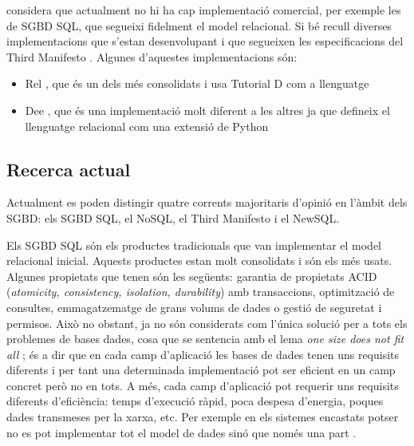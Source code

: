 \textcite[cap.~2]{date06} %
considera que actualment no hi ha cap implementació comercial, per
exemple les de \gls{SGBD} \gls{SQL}, que segueixi fidelment el model relacional.
Si bé recull diverses implementacions que
s'estan desenvolupant i que segueixen les
especificacions del Third
Manifesto \parencite[Projects]{date:thethirdmanifesto.com}.  Algunes
d'aquestes implementacions són:
\begin{itemize}
\item Rel \parencite{rel}, que és un dels més consolidats i usa
  Tutorial D com a llenguatge
\item Dee \parencite{dee}, que és una implementació molt diferent a
  les altres ja que defineix el llenguatge relacional com una extensió
  de Python

\end{itemize}










\subsection{Recerca actual}

Actualment es poden distingir quatre corrents majoritaris d'opinió en
l'àmbit dels \gls{SGBD}: els \gls{SGBD} \gls{SQL}, el NoSQL, el Third Manifesto i el
NewSQL.

Els \gls{SGBD} \gls{SQL} són els productes tradicionals que van implementar el
model relacional inicial. Aquests productes estan molt consolidats i
són els més usats. Algunes propietats que tenen són les següents:
garantia de propietats ACID (\emph{atomicity, consistency, isolation,
  durability}) amb transaccions, optimització de consultes,
emmagatzematge de grans volums de dades o gestió de seguretat i
permisos.  Això no obstant, ja no són considerats com l'única solució
per a tots els problemes de bases dades, cosa que se sentencia amb el
lema \emph{one size does not fit
  all} \parencite{stonebraker07,stonebraker09}; és a dir que en cada
camp d'aplicació les bases de dades tenen uns requisits diferents i
per tant una determinada implementació pot ser eficient en un camp
concret però no en tots. A més, cada camp d'aplicació pot requerir uns
requisits diferents d'eficiència: temps d'execució ràpid, poca despesa
d'energia, poques dades transmeses per la xarxa, etc. Per exemple en
els sistemes encastats potser no es pot implementar tot el model de
dades sinó que només una
part \parencite{saake09:_downs_data_manag_embed_system}.



